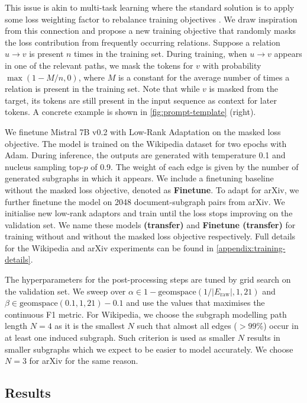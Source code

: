 This issue is akin to multi-task learning \cite{caruana1997multitask} where the standard solution is to apply some loss weighting factor to rebalance training objectives \cite{sermanet2013overfeat,kendall2018multi}. We draw inspiration from this connection and propose a new training objective that randomly masks the loss contribution from frequently occurring relations. Suppose a relation $u \to v$ is present $n$ times in the training set. During training, when $u \to v$ appears in one of the relevant paths, we mask the tokens for $v$ with probability $\max(1 - M/n, 0)$, where $M$ is a constant for the average number of times a relation is present in the training set. Note that while $v$ is masked from the target, its tokens are still present in the input sequence as context for later tokens. A concrete example is shown in \cref{fig:prompt-template} (right).

We finetune Mistral 7B v0.2 \cite{jiang2023mistral} with Low-Rank Adaptation \cite{hu2021lora} on the masked loss objective. The model is trained on the Wikipedia dataset for two epochs with Adam. During inference, the outputs are generated with temperature 0.1 and nucleus sampling \cite{holtzman2019curious} top-$p$ of 0.9. The weight of each edge is given by the number of generated subgraphs in which it appears. We include a finetuning baseline without the masked loss objective, denoted as \textbf{Finetune}. To adapt \name for arXiv, we further finetune the model on 2048 document-subgraph pairs from arXiv. We initialise new low-rank adaptors and train until the loss stops improving on the validation set. We name these models \textbf{\name (transfer)} and \textbf{Finetune (transfer)} for training without and without the masked loss objective respectively. Full details for the Wikipedia and arXiv experiments can be found in \cref{appendix:training-details}.

The hyperparameters for the post-processing steps are tuned by grid search on the validation set. We sweep over $\alpha \in 1 - \text{geomspace}(1 / |E_\text{raw}|, 1, 21)$ and $\beta \in \text{geomspace}(0.1, 1, 21) - 0.1$ and use the values that maximises the continuous F1 metric. For Wikipedia, we choose the subgraph modelling path length $N=4$ as it is the smallest $N$ such that almost all edges ($>99\%$) occur in at least one induced subgraph. Such criterion is used as smaller $N$ results in smaller subgraphs which we expect to be easier to model accurately. We choose $N=3$ for arXiv for the same reason.

\subsection{Results}

